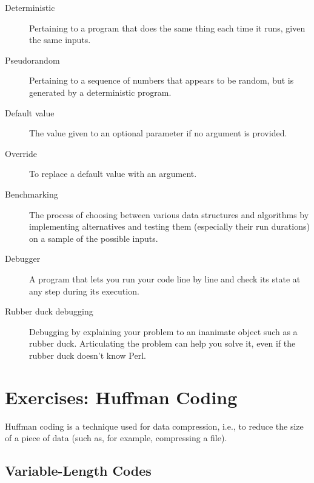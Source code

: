 \begin{description}

\item[Deterministic] Pertaining to a program that does the same
thing each time it runs, given the same inputs.

\item[Pseudorandom] Pertaining to a sequence of numbers that appears
to be random, but is generated by a deterministic program.

\item[Default value] The value given to an optional parameter if no
argument is provided.

\item[Override] To replace a default value with an argument.

\item[Benchmarking] The process of choosing between various data 
structures and algorithms by implementing alternatives and testing 
them (especially their run durations) on a sample of the possible inputs.  

\item[Debugger] A program that lets you run your code line by 
line and check its state at any step during its execution.

\item[Rubber duck debugging] Debugging by explaining your problem
to an inanimate object such as a rubber duck.  Articulating the
problem can help you solve it, even if the rubber duck 
doesn't know Perl. 

\end{description}



\section{Exercises: Huffman Coding}
\label{huffman_exercise}

Huffman coding is a technique used for data compression, i.e., 
to reduce the size of a piece of data (such as, for example, 
compressing a file).

\subsection{Variable-Length Codes}

